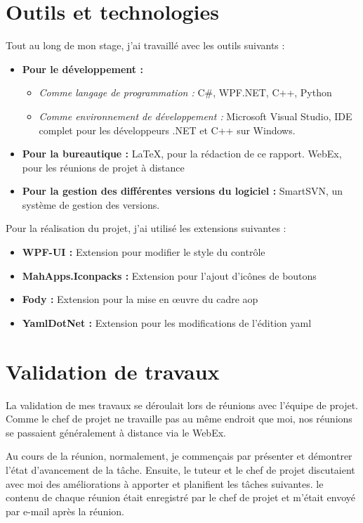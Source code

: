 \section{Outils et technologies}
Tout au long de mon stage, j'ai travaillé avec les outils suivants : 
\begin{itemize}
    \item \textbf{Pour le développement :}
    \begin{itemize}
        \item \textit{Comme langage de programmation :} C\#, WPF.NET, C++, Python 
        \item \textit{Comme environnement de développement :} Microsoft Visual Studio, \gls{IDE}  complet pour les développeurs .NET et C++ sur Windows.
    \end{itemize}
    \item \textbf{Pour la bureautique :} \gls{LaTeX}, pour la rédaction de ce rapport. WebEx, pour les réunions de projet à distance
    \item \textbf{Pour la gestion des différentes versions du logiciel :} \gls{SmartSVN}, un système de gestion des versions.
\end{itemize}

Pour la réalisation du projet, j'ai utilisé les extensions suivantes :
\begin{itemize}
    \item \textbf{WPF-UI :} Extension pour modifier le style du contrôle
    \item \textbf{MahApps.Iconpacks :} Extension pour l'ajout d'icônes de boutons
    \item \textbf{Fody :} Extension pour la mise en œuvre du cadre aop
    \item \textbf{YamlDotNet :} Extension pour les modifications de l'édition yaml
\end{itemize}


\section{Validation de travaux}
La validation de mes travaux se déroulait lors de réunions avec l'équipe de projet. Comme le chef de projet ne travaille pas au même endroit que moi, nos réunions se passaient généralement à distance via le WebEx.

Au cours de la réunion, normalement, je commençais par présenter et démontrer l'état d'avancement de la tâche. Ensuite, le tuteur et le chef de projet discutaient avec moi des améliorations à apporter et planifient les tâches suivantes. le contenu de chaque réunion était enregistré par le chef de projet et m’était envoyé par e-mail après la réunion.

